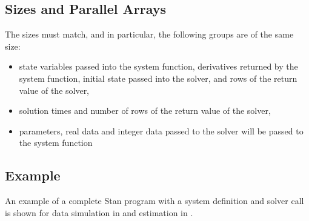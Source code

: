 \subsection{Sizes and Parallel Arrays}

The sizes must match, and in particular, the following groups are of
the same size:
%
\begin{itemize}
\item state variables passed into the system function,
  derivatives returned by the system function, initial state passed
  into the solver, and rows of the return value of the solver,
\item solution times and number of rows of the return value of the solver,
\item parameters, real data and integer data passed to the solver will
  be passed to the system function
\end{itemize}
%

\subsection{Example}

An example of a complete Stan program with a system definition and
solver call is shown for data simulation in  and
estimation in .




